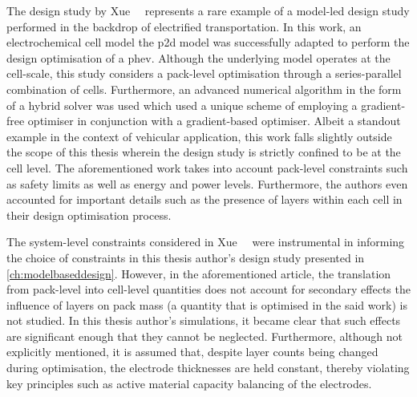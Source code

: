 The design  study by  Xue~\etal~\cite{Xue2013a} represents a  rare example  of a
model-led design study performed in  the backdrop of electrified transportation.
In  this work,  an electrochemical  cell model  \viz{} the  \gls{p2d} model  was
successfully  adapted  to  perform  the design  optimisation  of  a  \gls{phev}.
Although the underlying  model operates at the cell-scale,  this study considers
a  pack-level  optimisation  through  a series-parallel  combination  of  cells.
Furthermore, an advanced numerical algorithm in  the form of a hybrid solver was
used  which used  a  unique scheme  of employing  a  gradient-free optimiser  in
conjunction with  a gradient-based optimiser.  Albeit a standout example  in the
context of vehicular application, this work  falls slightly outside the scope of
this thesis  wherein the  design study is  strictly confined to  be at  the cell
level. The aforementioned work takes into account pack-level constraints such as
safety limits as well as energy  and power levels. Furthermore, the authors even
accounted for important details such as  the presence of layers within each cell
in their design optimisation process.


The  system-level  constraints   considered  in  Xue~\etal~\cite{Xue2013a}  were
instrumental   in  informing   the  choice   of  constraints   in  this   thesis
author's  design  study  presented in  \cref{ch:modelbaseddesign}.  However,  in
the  aforementioned article,  the  translation from  pack-level into  cell-level
quantities does not account for secondary  effects \ie{} the influence of layers
on pack mass (a quantity that is optimised  in the said work) is not studied. In
this  thesis  author's  simulations,  it  became clear  that  such  effects  are
significant  enough that  they cannot  be neglected.  Furthermore, although  not
explicitly mentioned,  it is  assumed that, despite  layer counts  being changed
during  optimisation,  the  electrode  thicknesses are  held  constant,  thereby
violating  key principles  such as  active  material capacity  balancing of  the
electrodes.

